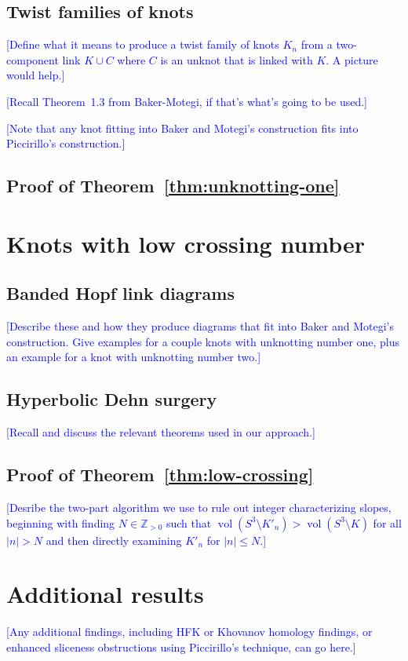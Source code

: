 \documentclass[11pt,usenames,dvipsnames,reqno]{amsart}
\newcommand{\zz}{\mathbb{Z}}
\newcommand{\vol}{\operatorname{vol}}
\numberwithin{theorem}{section}
\theoremstyle{ex}
\theoremstyle{rem}
\def\kh#1{\textcolor{Blue}{#1}}
\begin{document}
\subsection{Twist families of knots}

\kh{[Define what it means to produce a twist family of knots $K_n$ from a two-component link $K\cup C$ where $C$ is an unknot that is linked with $K$. A picture would help.]}

\kh{[Recall Theorem~1.3 from Baker-Motegi, if that's what's going to be used.]}

\kh{[Note that any knot fitting into Baker and Motegi's construction fits into Piccirillo's construction.]}

\subsection{Proof of Theorem~\ref{thm:unknotting-one}}

\section{Knots with low crossing number}

\subsection{Banded Hopf link diagrams} \kh{[Describe these and how they produce diagrams that fit into Baker and Motegi's construction. Give examples for a couple knots with unknotting number one, plus an example for a knot with unknotting number two.]}


\subsection{Hyperbolic Dehn surgery} \kh{[Recall and discuss the relevant theorems used in our approach.]}

\subsection{Proof of Theorem~\ref{thm:low-crossing}}

\kh{[Desribe the two-part algorithm we use to rule out integer characterizing slopes, beginning with finding $N \in \zz_{>0}$ such that $\vol(S^3 \setminus K'_n)> \vol(S^3 \setminus K)$ for all $|n|>N$ and then directly examining $K'_n$ for $|n| \leq N$.]}

\section{Additional results}

\kh{[Any additional findings, including HFK or Khovanov homology findings, or enhanced sliceness obstructions using Piccirillo's technique, can go here.]}




\end{document}
